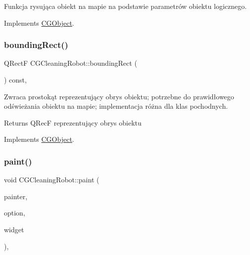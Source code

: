 Funkcja rysująca obiekt na mapie na podstawie parametrów obiektu logicznego. 



Implements \mbox{\hyperlink{class_c_g_object_a859e765fbb3ab0d6ad73ca58e5e49779}{C\+G\+Object}}.

\mbox{\label{class_c_g_cleaning_robot_a6fe8401e3b604cf5c3e449a56bb5655c}} 
\subsubsection{\texorpdfstring{bounding\+Rect()}{boundingRect()}}
{\footnotesize\ttfamily Q\+RectF C\+G\+Cleaning\+Robot\+::bounding\+Rect (\begin{DoxyParamCaption}{ }\end{DoxyParamCaption}) const\hspace{0.3cm}{\ttfamily [override]}, {\ttfamily [virtual]}}



Zwraca prostokąt reprezentujący obrys obiektu; potrzebne do prawidłowego odświeżania obiektu na mapie; implementacja różna dla klas pochodnych. 

\begin{DoxyReturn}{Returns}
Q\+RecF reprezentujący obrys obiektu 
\end{DoxyReturn}


Implements \mbox{\hyperlink{class_c_g_object_ab9edf3d10a53c254cdb5d3d8de930207}{C\+G\+Object}}.

\mbox{\label{class_c_g_cleaning_robot_ad5c738dfd5633e0a4165309dd26033f5}} 
\subsubsection{\texorpdfstring{paint()}{paint()}}
{\footnotesize\ttfamily void C\+G\+Cleaning\+Robot\+::paint (\begin{DoxyParamCaption}\item[{Q\+Painter $\ast$}]{painter,  }\item[{const Q\+Style\+Option\+Graphics\+Item $\ast$}]{option,  }\item[{Q\+Widget $\ast$}]{widget }\end{DoxyParamCaption})\hspace{0.3cm}{\ttfamily [override]}, {\ttfamily [virtual]}}



